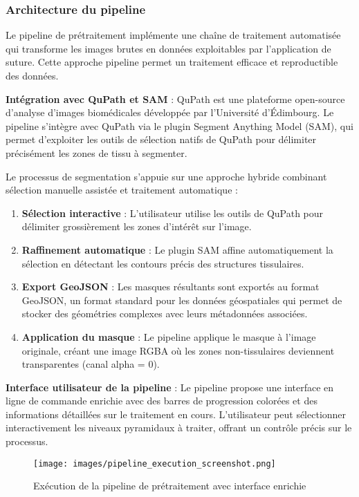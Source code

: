 \documentclass[12pt,a4paper]{report}
\begin{document}
\begin{}
\begin{}
\begin{}
\subsubsection{Architecture du pipeline}

Le pipeline de prétraitement implémente une chaîne de traitement automatisée qui transforme les images brutes en données exploitables par l'application de suture. Cette approche pipeline permet un traitement efficace et reproductible des données.

\textbf{Intégration avec QuPath et SAM} : QuPath est une plateforme open-source d'analyse d'images biomédicales développée par l'Université d'Édimbourg. Le pipeline s'intègre avec QuPath via le plugin Segment Anything Model (SAM), qui permet d'exploiter les outils de sélection natifs de QuPath pour délimiter précisément les zones de tissu à segmenter.

Le processus de segmentation s'appuie sur une approche hybride combinant sélection manuelle assistée et traitement automatique :

\begin{enumerate}
\item \textbf{Sélection interactive} : L'utilisateur utilise les outils de QuPath pour délimiter grossièrement les zones d'intérêt sur l'image.
\item \textbf{Raffinement automatique} : Le plugin SAM affine automatiquement la sélection en détectant les contours précis des structures tissulaires.
\item \textbf{Export GeoJSON} : Les masques résultants sont exportés au format GeoJSON, un format standard pour les données géospatiales qui permet de stocker des géométries complexes avec leurs métadonnées associées.
\item \textbf{Application du masque} : Le pipeline applique le masque à l'image originale, créant une image RGBA où les zones non-tissulaires deviennent transparentes (canal alpha = 0).
\end{enumerate}

\textbf{Interface utilisateur de la pipeline} : Le pipeline propose une interface en ligne de commande enrichie avec des barres de progression colorées et des informations détaillées sur le traitement en cours. L'utilisateur peut sélectionner interactivement les niveaux pyramidaux à traiter, offrant un contrôle précis sur le processus.

\begin{figure}[H]
\centering
\texttt{[image: images/pipeline\_execution\_screenshot.png]}
\caption{Exécution de la pipeline de prétraitement avec interface enrichie}
\label{fig:pipeline_execution}
\end{figure}


\end{}
\end{}
\end{}
\end{document}
